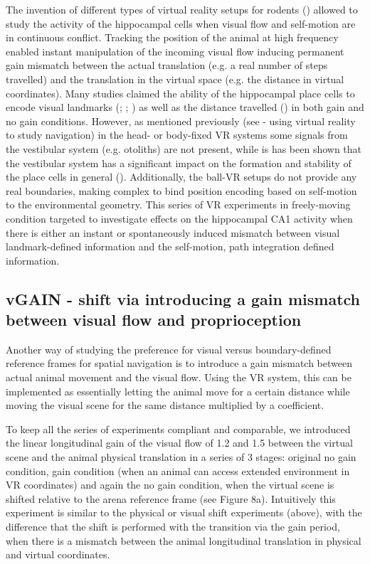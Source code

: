 The invention of different types of virtual reality setups for rodents (\cite{Thurley2016}) allowed to study the activity of the hippocampal cells when visual flow and self-motion are in continuous conflict. Tracking the position of the animal at high frequency enabled instant manipulation of the incoming visual flow inducing permanent gain mismatch between the actual translation (e.g. a real number of steps travelled) and the translation in the virtual space (e.g. the distance in virtual coordinates). Many studies claimed the ability of the hippocampal place cells to encode visual landmarks (\cite{Chen2013}; \cite{Aronov2014}; \cite{Jayakumar2018}) as well as the distance travelled (\cite{Haas2019}) in both gain and no gain conditions. However, as mentioned previously (see - using virtual reality to study navigation) in the head- or body-fixed VR systems some signals from the vestibular system (e.g. otoliths) are not present, while is has been shown that the vestibular system has a significant impact on the formation and stability of the place cells in general (\cite{Stackman2002}). Additionally, the ball-VR setups do not provide any real boundaries, making complex to bind position encoding based on self-motion to the environmental geometry. This series of VR experiments in freely-moving condition targeted to investigate effects on the hippocampal CA1 activity when there is either an instant or spontaneously induced mismatch between visual landmark-defined information and the self-motion, path integration defined information.


\subsection{vGAIN - shift via introducing a gain mismatch between visual flow and proprioception}

Another way of studying the preference for visual versus boundary-defined reference frames for spatial navigation is to introduce a gain mismatch between actual animal movement and the visual flow. Using the VR system, this can be implemented as essentially letting the animal move for a certain distance while moving the visual scene for the same distance multiplied by a coefficient.

To keep all the series of experiments compliant and comparable, we introduced the linear longitudinal gain of the visual flow of 1.2 and 1.5 between the virtual scene and the animal physical translation in a series of 3 stages: original no gain condition, gain condition (when an animal can access extended environment in VR coordinates) and again the no gain condition, when the virtual scene is shifted relative to the arena reference frame (see Figure 8a). Intuitively this experiment is similar to the physical or visual shift experiments (above), with the difference that the shift is performed with the transition via the gain period, when there is a mismatch between the animal longitudinal translation in physical and virtual coordinates.

